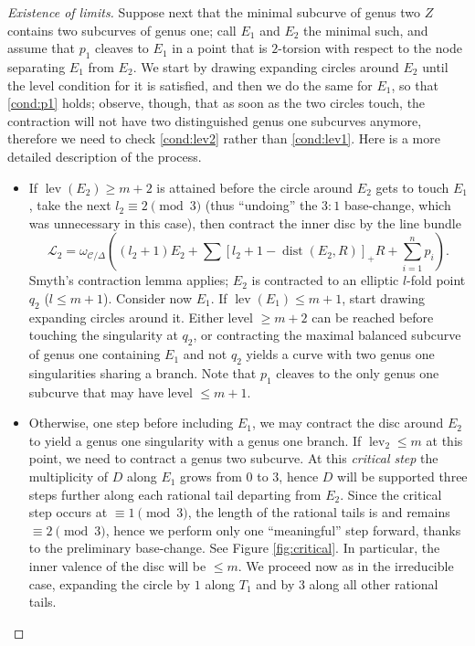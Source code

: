 \documentclass{compositio}
\newcommand{\dvr}{\Delta}
\newcommand{\lev}{\operatorname{lev}}
\theoremstyle{plain}
\theoremstyle{definition}
\theoremstyle{remark}
\begin{document}
\begin{proof}[Existence of limits]
  Suppose next that the minimal subcurve of genus two $Z$ contains two subcurves of genus one; call $E_1$ and $E_2$ the minimal such, and assume that $p_1$ cleaves to $E_1$ in a point that is $2$-torsion with respect to the node separating $E_1$ from $E_2$. We start by drawing expanding circles around $E_2$ until the level condition for it is satisfied, and then we do the same for $E_1$, so that \eqref{cond:p1} holds; observe, though, that as soon as the two circles touch, the contraction will not have two distinguished genus one subcurves anymore, therefore we need to check \eqref{cond:lev2} rather than \eqref{cond:lev1}. Here is a more detailed description of the process.
  \begin{itemize}[leftmargin=.4cm]
  \item If $\lev(E_2)\geq m+2$ is attained before the circle around $E_2$ gets to touch $E_1$, take the next $l_2\equiv 2  \pmod 3$ (thus ``undoing'' the $3:1$ base-change, which was unnecessary in this case), then contract the inner disc by the line bundle \[\mathcal L_2=\omega_{\mathcal C/\dvr}((l_2+1)E_2+\sum [l_2+1-\operatorname{dist}(E_2,R)]_+R+\sum_{i=1}^n p_i).\] Smyth's contraction lemma \cite[Lemma 2.13]{SMY1} applies; $E_2$ is contracted to an elliptic $l$-fold point $q_2$ ($l\leq m+1$). Consider now $E_1$. If $\lev(E_1)\leq m+1$, start drawing expanding circles around it. Either level $\geq m+2$ can be reached before touching the singularity at $q_2$, or contracting the maximal balanced subcurve of genus one containing $E_1$ and not $q_2$ yields a curve with two genus one singularities sharing a branch. Note that $p_1$ cleaves to the only genus one subcurve that may have level $\leq m+1$.
  \item Otherwise, one step before including $E_1$, we may contract the disc around $E_2$ to yield a genus one singularity with a genus one branch. If $\lev_2\leq m$ at this point, we need to contract a genus two subcurve. At this \emph{critical step} the multiplicity of $D$ along $E_1$ grows from $0$ to $3$, hence $D$ will be supported three steps further along each rational tail departing from $E_2$. Since the critical step occurs at $\equiv 1\pmod 3$, the length of the rational tails is and remains $\equiv 2 \pmod 3$, hence we perform only one ``meaningful'' step forward, thanks to the preliminary base-change. See Figure \ref{fig:critical}. In particular, the inner valence of the disc will be $\leq m$.
 We proceed now as in the irreducible case, expanding the circle by $1$ along $T_1$ and by $3$ along all other rational tails.
 \end{itemize}
 

\end{proof}
\end{document}
